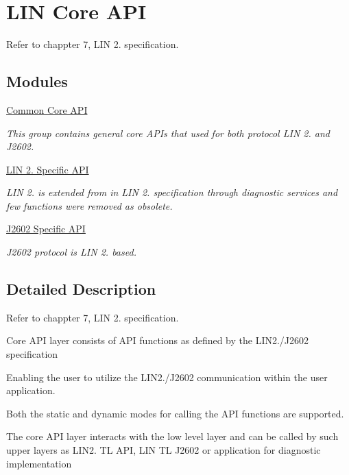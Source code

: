 \hypertarget{group__coreapi__group}{}\section{L\+I\+N Core A\+P\+I}
\label{group__coreapi__group}


Refer to chappter 7, L\+I\+N 2. specification.  


\subsection*{Modules}
\begin{DoxyCompactItemize}
\item 
\hyperlink{group__common__core__api__group}{Common Core A\+P\+I}
\begin{DoxyCompactList}\small\item\em This group contains general core A\+P\+Is that used for both protocol L\+I\+N 2. and J2602. \end{DoxyCompactList}\item 
\hyperlink{group___l_i_n21__core__api__group}{L\+I\+N 2. Specific A\+P\+I}
\begin{DoxyCompactList}\small\item\em L\+I\+N 2. is extended from in L\+I\+N 2. specification through diagnostic services and few functions were removed as obsolete. \end{DoxyCompactList}\item 
\hyperlink{group___j2602__core__api__group}{J2602 Specific A\+P\+I}
\begin{DoxyCompactList}\small\item\em J2602 protocol is L\+I\+N 2. based. \end{DoxyCompactList}\end{DoxyCompactItemize}


\subsection{Detailed Description}
Refer to chappter 7, L\+I\+N 2. specification. 


\begin{DoxyItemize}
\item Core A\+P\+I layer consists of A\+P\+I functions as defined by the L\+I\+N2./\+J2602 specification
\item Enabling the user to utilize the L\+I\+N2./\+J2602 communication within the user application.
\item Both the static and dynamic modes for calling the A\+P\+I functions are supported.
\item The core A\+P\+I layer interacts with the low level layer and can be called by such upper layers as L\+I\+N2. T\+L A\+P\+I, L\+I\+N T\+L J2602 or application for diagnostic implementation 
\end{DoxyItemize}